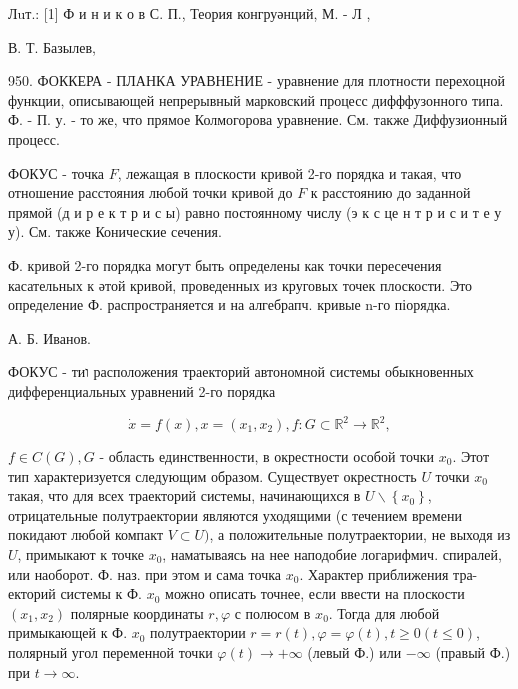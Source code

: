 \documentclass[10pt]{article}
\begin{document}
Лuт.: [1] Ф и н и к о в С. П., Теория конгруәнций, М. - Л ,

В. Т. Базылев,

950. ФОККЕРА - ПЛАНКА УРАВНЕНИЕ - уравнение для плотности перехоцной функции, описывающей непрерывный марковский процесс дифффузонного типа. Ф. - П. у. - то же, что прямое Колмогорова уравнение. См. также Диффузионный процесс.



ФОКУС - точка $F$, лежащая в плоскости кривой 2-го порядка и такая, что отношение расстояния любой точки кривой до $F$ к расстоянию до заданной прямой (д и р е к т р и с ы) равно постоянному числу (э к с це н т р и с и т е у у). См. также Конические сечения.



Ф. кривой 2-го порядка могут быть определены как точки пересечения касательных к әтой кривой, проведенных из круговых точек плоскости. Это определение Ф. распространяется и на алгебрапч. кривые n-го піорядка.



А. Б. Иванов.



ФОКУС - тиו расположения траекторий автономной системы обыкновенных дифференциальных уравнений 2-го порядка



\[

\dot{x}=f(x), x=\left(x_{1}, x_{2}\right), f: G \subset \mathbb{R}^{2} \longrightarrow \mathbb{R}^{2},

\]



$f \in C(G), G$ - область единственности, в окрестности особой точки $x_{0}$. Этот тип характеризуется следующим образом. Существует окрестность $U$ точки $x_{0}$ такая, что для всех траекторий системы, начинающихся в $U \backslash\left\{x_{0}\right\}$, отрицательные полутраектории являются уходящими (с течением времени покидают любой компакт $V \subset U)$, а положительные полутраектории, не выходя из $U$, примыкают к точке $x_{0}$, наматываясь на нее наподобие логарифмич. спиралей, или наоборот. Ф. наз. при этом и сама точка $x_{0}$. Характер приближения тра- екторий системы к Ф. $x_{0}$ можно описать точнее, если ввести на плоскости $\left(x_{1}, x_{2}\right)$ полярные координаты $r, \varphi$ с полюсом в $x_{0}$. Тогда для любой примыкающей к Ф. $x_{0}$ полутраектории $r=r(t), \varphi=\varphi(t), t \geqslant 0(t \leqslant 0)$, полярный угол переменной точки $\varphi(t) \rightarrow+\infty$ (левый Ф.) или $-\infty$ (правый Ф.) при $t \rightarrow \infty$.
\end{document}
